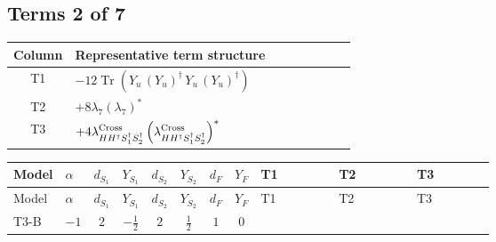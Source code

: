 \documentclass[8pt]{article}
\begin{document}
\begin{landscape}
\subsection*{Terms 2 of 7}
\begin{center}
\begin{tabular}{@{}c >{\raggedright\arraybackslash}p{0.82\linewidth}@{}}
\toprule
Column & Representative term structure \\
\midrule
T1 & \(\displaystyle -12 \operatorname{Tr}\!\left({Y_u}\,\left({Y_u}\right)^{\dagger}\,{Y_u}\,\left({Y_u}\right)^{\dagger}\right)\) \\
\midrule
T2 & \(\displaystyle +8 {\lambda_7} \left({\lambda_7}\right)^{*}\) \\
\midrule
T3 & \(\displaystyle +4 {\lambda_{H H^\dagger S_1^\dagger S_2^\dagger}^{\rm Cross}} \left({\lambda_{H H^\dagger S_1^\dagger S_2^\dagger}^{\rm Cross}}\right)^{*}\) \\
\midrule
\bottomrule
\end{tabular}
\end{center}
\smallskip
\tiny
\begin{longtable}{@{}llcccccc >{\raggedright\arraybackslash}p{0.21\linewidth} >{\raggedright\arraybackslash}p{0.21\linewidth} >{\raggedright\arraybackslash}p{0.21\linewidth}@{}}
\toprule
Model & $\alpha$ & $d_{S_1}$ & $Y_{S_1}$ & $d_{S_2}$ & $Y_{S_2}$ & $d_F$ & $Y_F$ & T1 & T2 & T3 \\
\midrule
\endfirsthead
\toprule
Model & $\alpha$ & $d_{S_1}$ & $Y_{S_1}$ & $d_{S_2}$ & $Y_{S_2}$ & $d_F$ & $Y_F$ & T1 & T2 & T3 \\
\midrule
\endhead
T3-B & $-1$ & $2$ & $-\frac{1}{2}$ & $2$ & $\frac{1}{2}$ & $1$ & $0$ & \scriptsize\adjustbox{max width=\linewidth}{$\begin{gathered} -12 \operatorname{Tr}\!\left({Y_u}\,\left({Y_u}\right)^{\dagger}\,{Y_u}\,\left({Y_u}\right)^{\dagger}\right)\end{gathered}$} & \scriptsize\adjustbox{max width=\linewidth}{$\begin{gathered} +8 {\lambda_7} \left({\lambda_7}\right)^{*}\end{gathered}$} & \scriptsize\adjustbox{max width=\linewidth}{$\begin{gathered} +4 {\lambda_{H H^\dagger S_1^\dagger S_2^\dagger}^{\rm Cross}} \left({\lambda_{H H^\dagger S_1^\dagger S_2^\dagger}^{\rm Cross}}\right)^{*}\end{gathered}$} \\
\midrule

\end{longtable}
\end{landscape}
\end{document}
